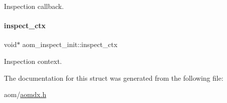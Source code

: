 Inspection callback. \mbox{\label{structaom__inspect__init_a26c618c754d4b278fb636353e6b9d96d}} 
\paragraph{\texorpdfstring{inspect\+\_\+ctx}{inspect\_ctx}}
{\footnotesize\ttfamily void$\ast$ aom\+\_\+inspect\+\_\+init\+::inspect\+\_\+ctx}

Inspection context. 

The documentation for this struct was generated from the following file\+:\begin{DoxyCompactItemize}
\item 
aom/\hyperlink{aomdx_8h}{aomdx.\+h}\end{DoxyCompactItemize}
